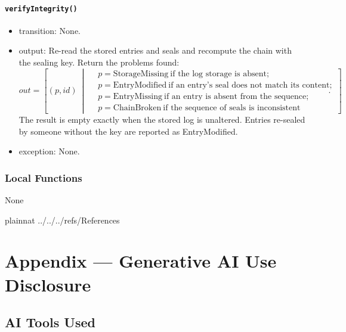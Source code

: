 \documentclass[12pt, titlepage]{article}
\begin{document}
\paragraph{\texttt{verifyIntegrity()}}
\begin{itemize}
    \item transition: None.
    \item output: Re-read the stored entries and seals and recompute the chain with the sealing key. Return the problems found:
    \[
        out=\left[(p,id)\ \middle|\ \begin{aligned}
                                        &p=\text{StorageMissing}\ \text{if the log storage is absent};\\
                                        &p=\text{EntryModified}\ \text{if an entry's seal does not match its content};\\
                                        &p=\text{EntryMissing}\ \text{if an entry is absent from the sequence};\\
                                        &p=\text{ChainBroken}\ \text{if the sequence of seals is inconsistent}
        \end{aligned}\right].
    \]
    The result is empty exactly when the stored log is unaltered. Entries re-sealed by someone without the key are reported as EntryModified.
    \item exception: None.
\end{itemize}

\subsubsection{Local Functions}
None

\newpage

 {plainnat}
 {../../../refs/References}

\newpage

\newpage{}

\section{Appendix --- Generative AI Use Disclosure}


\subsection{AI Tools Used}
\end{document}
